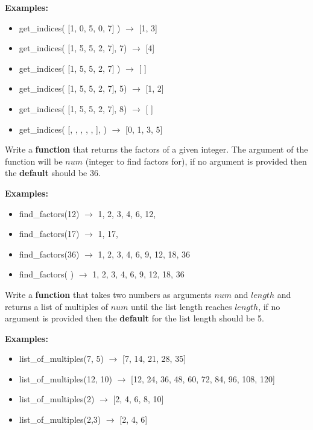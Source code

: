 		\textbf{Examples:}		
		\begin{itemize}
			\item  get\_indices( [1, 0, 5, 0, 7] ) $\rightarrow$ [1, 3]
			\item  get\_indices( [1, 5, 5, 2, 7], 7) $\rightarrow$ [4]
			\item  get\_indices( [1, 5, 5, 2, 7] ) $\rightarrow$ [ ]
			\item  get\_indices( [1, 5, 5, 2, 7], 5) $\rightarrow$ [1, 2]
			\item  get\_indices( [1, 5, 5, 2, 7], 8) $\rightarrow$ [ ]
			\item  get\_indices( [\csq{a}, , , , , \csq{a}], ) 
				$\rightarrow$ [0, 1, 3, 5]
		\end{itemize}


	\item 
		Write a \textbf{function} that returns the factors of a given integer. 
		The argument of the function will be $num$ (integer to find factors for), 
		if no argument is provided then the \textbf{default} should be 36.

		\textbf{Examples:}		
		\begin{itemize}
			\item  find\_factors(12) $\rightarrow$ 1, 2, 3, 4, 6, 12, 
			\item  find\_factors(17) $\rightarrow$ 1, 17,
			\item  find\_factors(36) $\rightarrow$ 1, 2, 3, 4, 6, 9, 12, 18, 36
			\item  find\_factors( ) $\rightarrow$ 1, 2, 3, 4, 6, 9, 12, 18, 36
		\end{itemize}


	\item
		Write a \textbf{function} that takes two numbers as arguments $num$ and $length$ and 
		returns a list of multiples of $num$ until the list length reaches $length$, if no 
		argument is provided then the \textbf{default} for the list length should be 5.

		\textbf{Examples:}		
		\begin{itemize}
			\item  list\_of\_multiples(7, 5) $\rightarrow$ [7, 14, 21, 28, 35]
			\item  list\_of\_multiples(12, 10) $\rightarrow$ [12, 24, 36, 48, 60, 72, 84, 96, 108, 120]
			\item  list\_of\_multiples(2) $\rightarrow$ [2, 4, 6, 8, 10]
			\item  list\_of\_multiples(2,3) $\rightarrow$ [2, 4, 6]
		\end{itemize}





